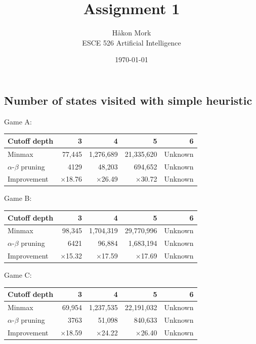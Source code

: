 \documentclass[letterpaper, 10pt]{article}
\title{\textbf{Assignment 1}}
\author{Håkon Mork \\ ESCE 526 Artificial Intelligence}
\date{\today}
\numberwithin{theorem}{section}
\begin{document}
\maketitle
\noindent

\section{}
\subsection{Number of states visited with simple heuristic}
Game A:
\begin{table}[h]
	\centering
	\small
	\begin{tabular}{lrrrr}
		Cutoff depth & 3 & 4 & 5 & 6 \\
		\midrule
		Minmax & 77,445 & 1,276,689 & 21,335,620 &  Unknown \\
		$\alpha$-$\beta$ pruning & 4129 & 48,203 & 694,652 & Unknown \\
		\midrule
		Improvement & $\times$18.76 & $\times$26.49 & $\times$30.72 & Unknown
	\end{tabular}
\end{table}

\noindent Game B:
\begin{table}[h]
	\centering
	\small
	\begin{tabular}{lrrrr}
		Cutoff depth & 3 & 4 & 5 & 6 \\
		\midrule
		Minmax & 98,345 & 1,704,319 & 29,770,996 & Unknown \\
		$\alpha$-$\beta$ pruning & 6421 & 96,884 & 1,683,194 & Unknown \\
		\midrule
		Improvement & $\times$15.32 & $\times$17.59 & $\times$17.69 & Unknown
	\end{tabular}
\end{table}

\noindent Game C:
\begin{table}[h]
	\centering
	\small
	\begin{tabular}{lrrrr}
		Cutoff depth & 3 & 4 & 5 & 6 \\
		\midrule
		Minmax & 69,954 & 1,237,535 & 22,191,032 & Unknown \\
		$\alpha$-$\beta$ pruning & 3763 & 51,098 & 840,633 & Unknown \\
		\midrule
		Improvement & $\times$18.59 & $\times$24.22 & $\times$26.40 & Unknown
	\end{tabular}
\end{table}
\end{document}
